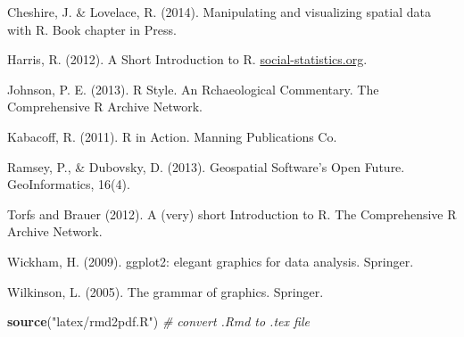 \documentclass[]{article}
\newenvironment{Shaded}{}{}
\newcommand{\KeywordTok}[1]{\textcolor[rgb]{0.00,0.44,0.13}{\textbf{{#1}}}}
\newcommand{\StringTok}[1]{\textcolor[rgb]{0.25,0.44,0.63}{{#1}}}
\newcommand{\CommentTok}[1]{\textcolor[rgb]{0.38,0.63,0.69}{\textit{{#1}}}}
\newcommand{\NormalTok}[1]{{#1}}
\begin{document}
Cheshire, J. \& Lovelace, R. (2014). Manipulating and visualizing
spatial data with R. Book chapter in Press.

Harris, R. (2012). A Short Introduction to R.
\href{http://www.social-statistics.org/}{social-statistics.org}.

Johnson, P. E. (2013). R Style. An Rchaeological Commentary. The
Comprehensive R Archive Network.

Kabacoff, R. (2011). R in Action. Manning Publications Co.

Ramsey, P., \& Dubovsky, D. (2013). Geospatial Software's Open Future.
GeoInformatics, 16(4).

Torfs and Brauer (2012). A (very) short Introduction to R. The
Comprehensive R Archive Network.

Wickham, H. (2009). ggplot2: elegant graphics for data analysis.
Springer.

Wilkinson, L. (2005). The grammar of graphics. Springer.

\begin{Shaded}
\begin{Highlighting}[]
\KeywordTok{source}\NormalTok{(}\StringTok{"latex/rmd2pdf.R"}\NormalTok{)  }\CommentTok{# convert .Rmd to .tex file}
\end{Highlighting}
\end{Shaded}
\end{document}
